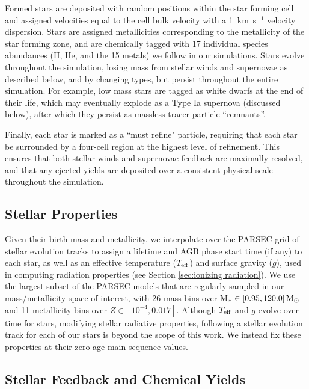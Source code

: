 \documentclass[twocolumn]{aastex61}
\begin{document}
Formed stars are deposited with random positions within the star forming cell and assigned velocities equal to the cell bulk velocity with a 1~km~s$^{-1}$ velocity dispersion. Stars are assigned metallicities corresponding to the metallicity of the star forming zone, and are chemically tagged with 17 individual species abundances (H, He, and the 15 metals) we follow in our simulations. Stars evolve throughout the simulation, losing mass from stellar winds and supernovae as described below, and by changing types, but persist throughout the entire simulation. For example, low mass stars are tagged as white dwarfs at the end of their life, which may eventually explode as a Type Ia supernova (discussed below), after which they persist as massless tracer particle ``remnants''. 

Finally, each star is marked as a ``must refine" particle, requiring that each star be surrounded by a four-cell region at the highest level of refinement. This ensures that both stellar winds and supernovae feedback are maximally resolved, and that any ejected yields are deposited over a consistent physical scale throughout the simulation.

\subsection{Stellar Properties}
\label{sec:properties}
Given their birth mass and metallicity, we interpolate over the PARSEC grid of stellar evolution tracks \citep{Bressan2012} to assign a lifetime and AGB phase start time (if any) to each star, as well as an effective temperature ($T_{\rm eff}$) and surface gravity ($g$), used in computing radiation properties (see Section \ref{sec:ionizing radiation}). We use the largest subset of the PARSEC models that are regularly sampled in our mass/metallicity space of interest, with 26 mass bins over M$_{*} \in \left[0.95, 120.0 \right] {\rm M_{\odot}}$ and 11 metallicity bins over $Z \in \left[10^{-4}, 0.017 \right]$. Although $T_{\rm eff}$ and $g$ evolve over time for stars, modifying stellar radiative properties, following a stellar evolution track for each of our stars is beyond the scope of this work. We instead fix these properties at their zero age main sequence values.

\subsection{Stellar Feedback and Chemical Yields}
\end{document}
